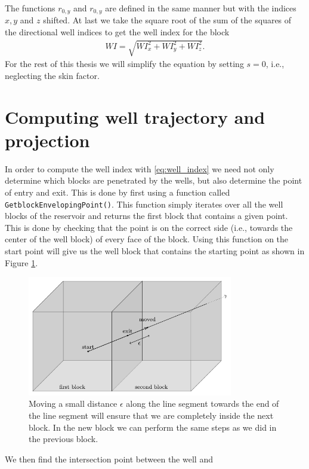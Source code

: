 %
The functions $r_{0,y}$ and $r_{0,y}$ are defined in the 
same manner but with the indices $x, y$ and $z$ shifted.
%
At last we take the square root of the sum of the squares
of the directional well indices to get the well index for
the block
%
\begin{align}
WI = \sqrt{WI_x^2 + WI_y^2 + WI_z^2}.
\label{eq:well_index}
\end{align}
%
For the rest of 
this thesis we will simplify the equation by setting $s = 0$, 
i.e., neglecting the skin factor.
%
\section{Computing well trajectory and projection}
% 
In order to compute the well index with \eqref{eq:well_index}
we need not only determine which blocks are penetrated 
by the wells, but also determine the point of entry and
exit. This is done by first using a function called 
\texttt{GetblockEnvelopingPoint()}. This function simply iterates
over all the well blocks of the reservoir and returns the first
block that contains a given point. This is done by checking that
the point is on the correct side (i.e., towards the center of the 
well block) of every face of the block. Using this function on the 
start point will give us the well block that contains the 
starting point as shown in Figure \ref{fig:intersect_block_epsilon}.
%
\begin{figure}[H]
	\centering
	\includegraphics[width=0.80\textwidth]{figures/intersecting_wells/move_point_eps.pdf}
	\caption{Moving a small distance $\epsilon$ along the line segment
			 towards the end of the line segment will ensure that
			 we are completely inside the next block. In the new
			 block we can perform the same steps as we did in the previous block.}
	\label{fig:intersect_block_epsilon}
\end{figure}
%
We then find the intersection point between the well and 
